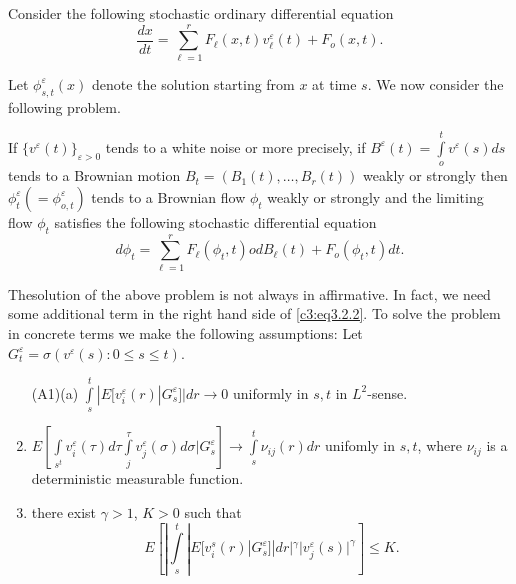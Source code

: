 Consider the following stochastic ordinary differential equation 
\begin{equation*}
  \frac{dx}{dt} = \sum_{\ell=1}^r F_\ell(x,t) v^\varepsilon_\ell (t) +
  F_o(x,t). \tag{3.2.1}\label{c3:eq3.2.1} 
\end{equation*}

Let $\phi^\varepsilon_{s,t}(x)$ denote the solution starting from $x$
at time  $s$. We now consider the following problem. 

\smallskip
{}  If $\{v^\varepsilon(t)\}_{\varepsilon >
  0}$ tends to a white noise 
  or more precisely, if $B^\varepsilon (t)= \int\limits^{t}_o
  v^\varepsilon (s)ds$ tends to a Brownian motion $B_t= (B_1(t),
  \ldots,  B_r(t))$ weakly or strongly then $\phi^\varepsilon_t(=
  \phi^\varepsilon_{o,t})$ tends to a Brownian flow $\phi_t$ weakly or
  strongly and the limiting flow $\phi_t$ satisfies the following
  stochastic differential equation  
  \begin{equation*} 
    d \phi_t= \sum^{r}_{\ell=1} F_\ell(\phi_t, t) odB_{\ell}(t)
    +F_o(\phi_t,t) dt. \tag{3.2.2}\label{c3:eq3.2.2} 
  \end{equation*}

  The\pageoriginale solution of the above problem is not always in affirmative. In fact, we
  need some additional term in the right hand side of \eqref{c3:eq3.2.2}. To
  solve the problem in concrete terms we make the following
  assumptions: Let $G^\varepsilon_t = \sigma(v^\varepsilon (s): 0 \le s
  \le t)$. 
  \begin{enumerate}[\rm (a)]
    \renewcommand{\theenumi}{\alph{enumi}}
    \renewcommand{\labelenumi}{\rm (\theenumi)}
  \item[{\rm (A1)(a)}] $\int\limits^t_s|E[v_i^\varepsilon (r) |G^\varepsilon_s ]| dr
    \to 0$ uniformly in $s,t$ in $L^2$-sense.

   \setcounter{enumi}{1}
  \item $E \left[ \int\limits_{s^t} v_i^\varepsilon (\tau ) d \tau
    \int\limits_{j}^\tau v^{\varepsilon}_j (\sigma) d \sigma|
    G^\varepsilon_s \right] \to 
    \int\limits_{s}^{t} \nu_{ij}(r)dr$ unifomly in $s,t$, where
    $\nu_{ij}$ is a deterministic measurable function. 

  \item there exist $\gamma > 1$, $K > 0$ such that  
    $$
    E\left[| \int\limits_{s}^t |E [v^s_i (r) |G^\varepsilon_s]|dr
      |^\gamma | v^\varepsilon_j (s)|^\gamma \right] \le K. 
    $$
  \end{enumerate}



